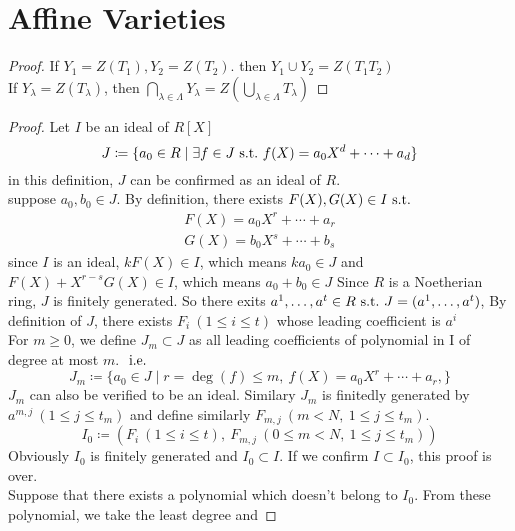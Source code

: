 \documentclass[leqno]{ltjsarticle}
\begin{document}
\section{Affine Varieties}
\begin{proof}
	If $Y_1=Z(T_1), Y_2=Z(T_2)$. then $Y_1\cup Y_2=Z(T_1T_2)$\\
	If $Y_{\lambda}=Z(T_{\lambda})$, then $\bigcap_{\lambda\in\Lambda}Y_\lambda = Z(\bigcup_{\lambda\in\Lambda}T_{\lambda})$
\end{proof}
\begin{proof}
	Let $I$ be an ideal of $R[X]$\\
	\[J\coloneq\{a_0\in R\mid \exists f\in J\ \mathrm{s.t.}\  f(X) = a_0X^d + \cdots + a_d\}\]
	in this definition, $J$ can be confirmed as an ideal of $R$.\\
	\because suppose $a_0 , b_0 \in J$. By definition, there exists $F(X), G(X)\in I \ \mathrm{s.t.}\ $
	\begin{gather*}
		F(X) = a_0X^r + \cdots + a_r\\
		G(X) = b_0X^s + \cdots + b_s
	\end{gather*}
	since $I$ is an ideal, $kF(X) \in I$, which means $ka_0\in J$ and $F(X) + X^{r-s}G(X) \in I$, which means $a_0 + b_0 \in J$
	Since $R$ is a Noetherian ring, $J$ is finitely generated. So there exits $a^1,\ldots, a^t \in R\ \mathrm{s.t.}\  J=(a^1,\ldots, a^t)$, By definition of $J$, there exists $F_i\ (1\le i \le t)$ whose leading coefficient is $a^i$\\
	For $m\ge 0$, we define $J_m\subset J$ as all leading coefficients of polynomial in I of degree at most $m$. $\ \mathrm{i.e.}\ $
	\[J_m \coloneq \{a_0 \in J\mid r= \deg(f) \leq m,\ f(X) = a_0X^r + \cdots + a_r, \}\]
	$J_m$ can also be verified to be an ideal. Similary $J_m$ is finitedly generated by $a^{m,j}\ (1\le j\le t_m)$ and define similarly $F_{m,j}\ (m<N,\ 1\le j\le t_m)$.\\
	\[I_0\coloneq (F_i\ (1\le i \le t),\ F_{m,j}\ (0\le m< N,\ 1\le j\le t_m))\]
	Obviously $I_0$ is finitely generated and $I_0 \subset I$. If we confirm $I\subset I_0$, this proof is over.\\
	Suppose that there exists a polynomial which doesn't belong to $I_0$. From these polynomial, we take the least degree and 
\end{proof}
\end{document}

